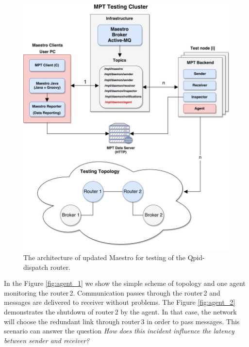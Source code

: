 \begin{figure}[H]
  \centering
  \includegraphics[width=15cm]{obrazky-figures/msg_perf_tool_for_router.pdf}
  \caption{The architecture of updated Maestro for testing of the Qpid-dispatch router.}
  \label{fig:msg_perf_tool_update}
\end{figure}

In the Figure \ref{fig:agent_1} we show the simple scheme of topology and one agent monitoring the router\,2. Communication passes through the router\,2 and messages are delivered to receiver without problems. The Figure \ref{fig:agent_2} demonstrates the shutdown of router\,2  by the agent. In that case, the network will choose the redundant link through router\,3 in order to pass messages. This scenario can answer the question \emph{How does this incident influence the latency between sender and receiver?}

